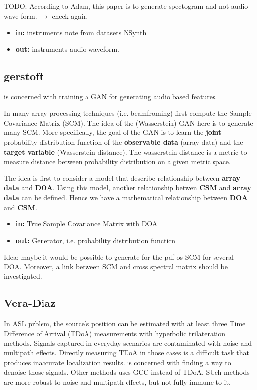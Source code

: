 \documentclass{article}
\begin{document}
TODO: According to Adam, this paper is to generate spectogram and not audio wave form. $\rightarrow$ check again
\begin{itemize}

    \item \textbf{in:} instruments note from datasets NSynth 
    \item \textbf{out:} instruments audio waveform.
\end{itemize}

\subsection{gerstoft}

\cite{gerstoft2020parametric} is concerned with training a GAN for generating audio based features. 

In many array processing techniques (i.e. beamfroming) first compute the Sample Covariance Matrix (SCM). The idea of the (Wasserstein) GAN here is to generate many SCM. More specifically, the goal of the GAN is to learn the \textbf{joint} probability distribution function of the \textbf{observable data} (array data) and the \textbf{target variable} (Wasserstein distance). The wasserstein distance is a metric to measure distance between probability distribution on a given metric space.

The idea is first to consider a model that describe relationship between \textbf{array data} and \textbf{DOA}. Using this model, another relationship betwen \textbf{CSM} and \textbf{array data} can be defined. Hence we have a mathematical relationship between \textbf{DOA} and \textbf{CSM}.

\begin{itemize}
    \item \textbf{in:} True Sample Covariance Matrix with DOA
    \item \textbf{out:} Generator, i.e. probability distribution function
\end{itemize}

Idea: maybe it would be possible to generate for the pdf os SCM for several DOA. Moreover, a link between SCM and cross spectral matrix should be investigated.

\subsection{Vera-Diaz}

In ASL prblem, the source’s position can be estimated with at least three Time Difference of Arrival (TDoA) measurements with hyperbolic trilateration methods. Signals captured in everyday scenarios are contaminated with noise and multipath effects.
Directly measuring TDoA in those cases is a diﬃcult task that produces inaccurate localization results.\cite{vera2021acoustic} is concerned with finding a way to denoise those signals. Other methods uses GCC instead of TDoA. SUch methods are more robust to noise and multipath effects, but not fully immune to it. 
\end{document}
